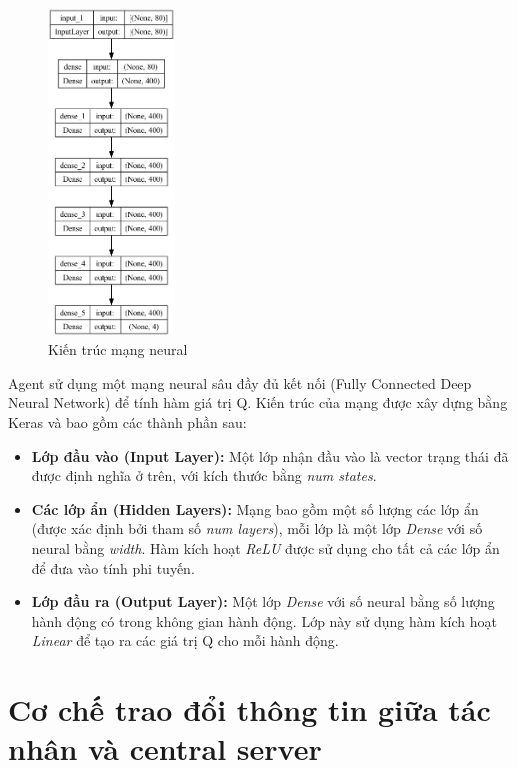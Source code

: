 \begin{figure}[!htp]
    \centering
    \includegraphics[width=0.3\textwidth]{img/model_structure}
    \caption{Kiến trúc mạng neural}
    \label{fig:model_structure}
\end{figure}

Agent sử dụng một mạng neural sâu đầy đủ kết nối (Fully Connected Deep Neural Network) để tính hàm giá trị Q. Kiến trúc của mạng được xây dựng bằng Keras và bao gồm các thành phần sau:

\begin{itemize}
    \item \textbf{Lớp đầu vào (Input Layer):} Một lớp nhận đầu vào là vector trạng thái đã được định nghĩa ở trên, với kích thước bằng \textit{num states}.

    \item \textbf{Các lớp ẩn (Hidden Layers):} Mạng bao gồm một số lượng các lớp ẩn (được xác định bởi tham số \textit{num layers}), mỗi lớp là một lớp \textit{Dense} với số neural bằng \textit{width}. Hàm kích hoạt \textit{ReLU} được sử dụng cho tất cả các lớp ẩn để đưa vào tính phi tuyến.

    \item \textbf{Lớp đầu ra (Output Layer):} Một lớp \textit{Dense} với số neural bằng số lượng hành động có trong không gian hành động. Lớp này sử dụng hàm kích hoạt \textit{Linear} để tạo ra các giá trị Q cho mỗi hành động.
\end{itemize}

\section{Cơ chế trao đổi thông tin giữa tác nhân và central server}



